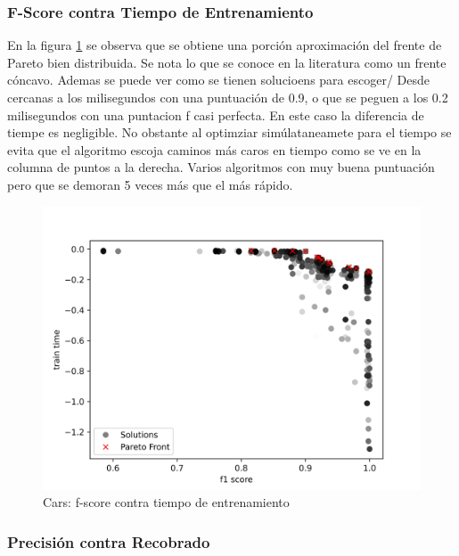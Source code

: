 \subsubsection{F-Score contra Tiempo de Entrenamiento}

En la figura \ref{impl:fig:cars:fscore_vs_time} se observa que se obtiene una porci\'on aproximaci\'on del frente de Pareto bien distribuida. Se nota lo que se conoce en la literatura como un frente c\'oncavo. Ademas se puede ver como se tienen solucioens para escoger/ Desde cercanas a los milisegundos con una puntuaci\'on de 0.9, o que se peguen a los 0.2 milisegundos con una puntacion f casi perfecta. En este caso la diferencia de tiempe es negligible. No obstante al optimziar sim\'ulataneamete para el tiempo se evita que el algoritmo escoja caminos m\'as caros en tiempo como se ve en la columna de puntos a la derecha. Varios algoritmos con muy buena puntuaci\'on pero que se demoran 5 veces m\'as que el m\'as r\'apido.


\begin{figure}[ht]
    \centering
    \includegraphics[scale=0.8]{Pictures/cars_fscore_vs_time.jpg}
    \caption{Cars: f-score contra tiempo de entrenamiento}
    \label{impl:fig:cars:fscore_vs_time}
\end{figure}


\subsubsection{Precisi\'on contra Recobrado}

